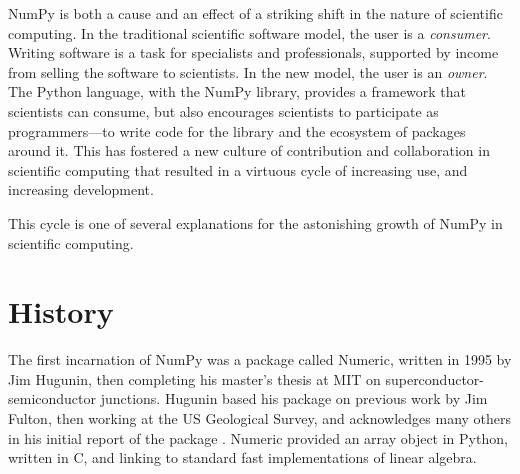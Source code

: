 
NumPy is both a cause and an effect of a striking shift in the nature of
scientific computing.  In the traditional scientific software model, the user is a {\it consumer}.  Writing software is a task for specialists and
professionals, supported by income from selling the software to
scientists.  In the new model, the user is an {\it owner}.  The Python language, with
the NumPy library, provides a framework that scientists can consume,
but also encourages scientists to participate as programmers---to
write code for the library and the ecosystem of packages around it.  This has
fostered a new culture of contribution and collaboration in scientific
computing that resulted in a virtuous cycle of increasing use, and increasing
development.

This cycle is one of several explanations for the astonishing growth of NumPy
in scientific computing.

\section*{History}

The first incarnation of NumPy was a package called Numeric, written in 1995
by Jim Hugunin, then completing his master's thesis at MIT on
superconductor-semiconductor junctions.  Hugunin based his package on previous
work by Jim Fulton, then working at the US Geological Survey, and acknowledges
many others in his initial report of the package \cite{Hugunin-whitepaper}.
Numeric provided an array object in Python, written in C, and linking to
standard fast implementations of linear algebra.

